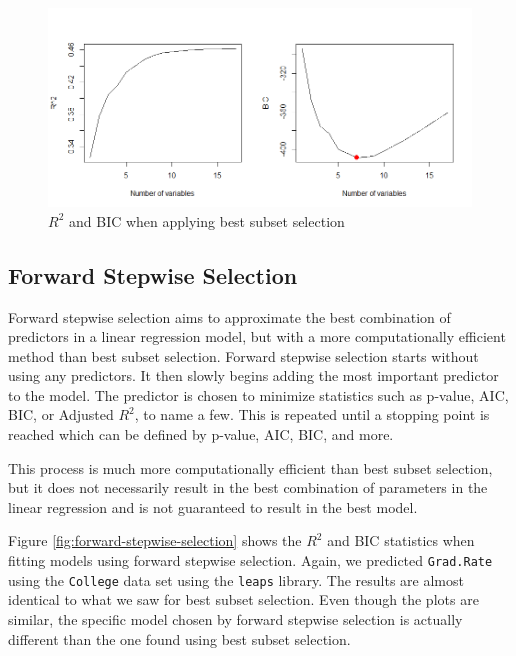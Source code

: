 \documentclass{article}
\begin{document}
\begin{figure}[!h]
	\centering
	\caption{$R^2$ and BIC when applying best subset selection}
	\label{fig:best-subset-selection}
	\includegraphics[width = 6in]{best-subset-selection.png}
\end{figure}

\subsection{Forward Stepwise Selection}
Forward stepwise selection aims to approximate the best combination of predictors in a linear regression model, but with a more computationally efficient method than best subset selection. Forward stepwise selection starts without using any predictors. It then slowly begins adding the most important predictor to the model. The predictor is chosen to minimize statistics such as p-value, AIC, BIC, or Adjusted $R^2$, to name a few. This is repeated until a stopping point is reached which can be defined by p-value, AIC, BIC, and more.

This process is much more computationally efficient than best subset selection, but it does not necessarily result in the best combination of parameters in the linear regression and is not guaranteed to result in the best model.

Figure \ref{fig:forward-stepwise-selection} shows the $R^2$ and BIC statistics when fitting models using forward stepwise selection. Again, we predicted \lstinline!Grad.Rate! using the \lstinline!College! data set using the \lstinline!leaps! library. The results are almost identical to what we saw for best subset selection. Even though the plots are similar, the specific model chosen by forward stepwise selection is actually different than the one found using best subset selection.
\end{document}
